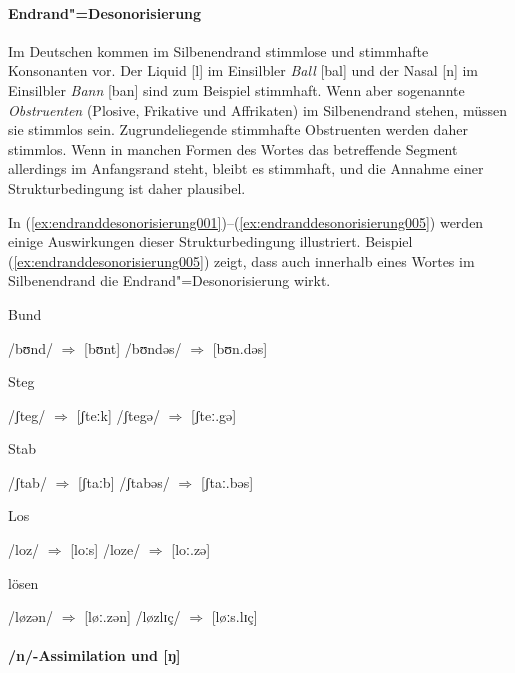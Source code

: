 \paragraph*{Endrand"=Desonorisierung}

Im Deutschen kommen im Silbenendrand stimmlose und stimmhafte Konsonanten vor.
Der Liquid [l] im Einsilbler \textit{Ball} [bal] und der Nasal [n] im Einsilbler \textit{Bann} [ban] sind zum Beispiel stimmhaft.
Wenn aber sogenannte \textit{Obstruenten} (Plosive, Frikative und Affrikaten) im Silbenendrand stehen, müssen sie stimmlos sein.
Zugrundeliegende stimmhafte Obstruenten werden daher stimmlos.
Wenn in manchen Formen des Wortes das betreffende Segment allerdings im Anfangsrand steht, bleibt es stimmhaft, und die Annahme einer Strukturbedingung ist daher plausibel.

In (\ref{ex:endranddesonorisierung001})--(\ref{ex:endranddesonorisierung005}) werden einige Auswirkungen dieser Strukturbedingung illustriert.
Beispiel (\ref{ex:endranddesonorisierung005}) zeigt, dass auch innerhalb eines Wortes im Silbenendrand die Endrand"=Desonorisierung wirkt.

\begin{exe}
  \ex Bund \label{ex:endranddesonorisierung001}
  \begin{xlist}
    \ex /bʊnd/ $\Rightarrow$ [bʊnt]
    \ex /bʊndəs/ $\Rightarrow$ [bʊn.dəs]
  \end{xlist}
  \ex Steg \label{ex:endranddesonorisierung002}
  \begin{xlist}
    \ex /ʃteg/ $\Rightarrow$ [ʃteːk]
    \ex /ʃtegə/ $\Rightarrow$ [ʃteː.gə]
  \end{xlist}
  \ex Stab \label{ex:endranddesonorisierung003}
  \begin{xlist}
    \ex /ʃtab/ $\Rightarrow$ [ʃtaːb]
    \ex /ʃtabəs/ $\Rightarrow$ [ʃtaː.bəs]
  \end{xlist}
  \ex Los \label{ex:endranddesonorisierung004}
  \begin{xlist}
    \ex /loz/ $\Rightarrow$ [loːs]
    \ex /loze/ $\Rightarrow$ [loː.zə]
  \end{xlist}
  \ex lösen \label{ex:endranddesonorisierung005}
  \begin{xlist}
    \ex /løzən/ $\Rightarrow$ [løː.zən]
    \ex /løzlɪç/ $\Rightarrow$ [løːs.lɪç]
  \end{xlist}
\end{exe}

\paragraph*{/n/-Assimilation und [ŋ]}

